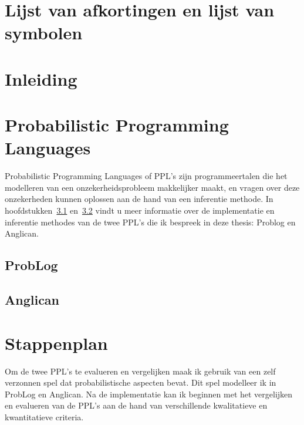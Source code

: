 \documentclass[12pt,a4paper,oneside]{book}
\begin{document}
\chapter{Lijst van afkortingen en lijst van symbolen}
\tableofcontents


\newpage
\mainmatter
\setcounter{page}{0}
\chapter{Inleiding}
\chapter{Probabilistic Programming Languages}
Probabilistic Programming Languages of PPL's zijn programmeertalen die het modelleren van een onzekerheidsprobleem makkelijker maakt, en vragen over deze onzekerheden kunnen oplossen aan de hand van een inferentie methode. In hoofdstukken~\ref{sec:problog} en~\ref{sec:anglican} vindt u meer informatie over de implementatie en inferentie methodes van de twee PPL's die ik bespreek in deze thesis: Problog en Anglican.
\section{ProbLog}
\label{sec:problog}
\section{Anglican}
\label{sec:anglican}

\chapter{Stappenplan}
Om de twee PPL's te evalueren en vergelijken maak ik gebruik van een zelf verzonnen spel dat probabilistische aspecten bevat. Dit spel modelleer ik in ProbLog en Anglican. Na de implementatie kan ik beginnen met het vergelijken en evalueren van de PPL's aan de hand van verschillende kwalitatieve en kwantitatieve criteria.
\end{document}
